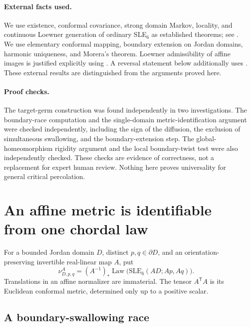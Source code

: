 \documentclass[11pt]{article}
\theoremstyle{definition}\newtheorem{definition}[theorem]{Definition}
\theoremstyle{remark}\newtheorem{remark}[theorem]{Remark}
\newcommand{\SLE}{\mathrm{SLE}_6}
\newcommand{\Law}{\operatorname{Law}}
\newcommand{\nuA}[4]{\nu^{#1}_{#2,#3,#4}}
\begin{document}
\paragraph{External facts used.}
We use existence, conformal covariance, strong domain Markov, locality,
and continuous Loewner generation of ordinary SLE$_6$ as established
theorems; see \cite{lawler}. We use elementary conformal mapping, boundary
extension on Jordan domains, harmonic uniqueness, and Morera's theorem.
Loewner admissibility of affine images is justified explicitly using
\cite{yuan}. A reversal statement below additionally uses \cite{ms}.
These external results are distinguished from the arguments proved here.

\paragraph{Proof checks.}
The target-germ construction was found independently in two investigations.
The boundary-race computation and the single-domain metric-identification
argument were checked independently, including the sign of the diffusion,
the exclusion of simultaneous swallowing, and the boundary-extension step.
The global-homeomorphism rigidity argument and the local boundary-twist
test were also independently checked. These checks are evidence of
correctness, not a replacement for expert human review. Nothing here proves
universality for general critical percolation.

\section{An affine metric is identifiable from one chordal law}
\label{sec:identifiability}

For a bounded Jordan domain $D$, distinct $p,q\in\partial D$, and an
orientation-preserving invertible real-linear map $A$, put
\begin{equation}
 \nuA{A}{D}{p}{q}
 = (A^{-1})_*\Law\bigl(\SLE(AD;Ap,Aq)\bigr).
 \label{eq:affine-law}
\end{equation}
Translations in an affine normalizer are immaterial. The tensor
$A^{\mathsf T}A$ is its Euclidean conformal metric, determined only up to a
positive scalar.

\subsection{A boundary-swallowing race}
\end{document}
